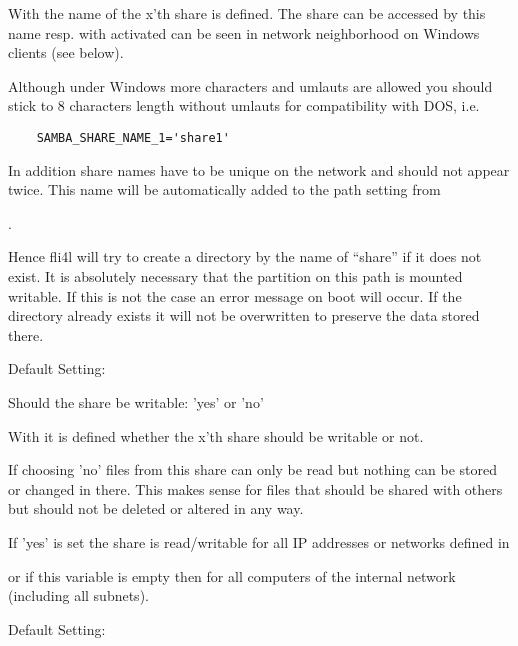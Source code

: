 \begin{description}

        With  the name of the x'th share is defined.
        The share can be accessed by this name resp. with 
        activated can be seen in network neighborhood on Windows clients
        (see  below).

        Although under Windows more characters and umlauts are allowed
        you should stick to 8 characters length without umlauts for
        compatibility with DOS,
        i.e.

\begin{example}
\begin{verbatim}
    SAMBA_SHARE_NAME_1='share1'
\end{verbatim}
\end{example}

  In addition share names have to be unique on the network and should not
  appear twice.
  This name will be automatically added to the path setting from

  .

  Hence fli4l will try to create a directory by the name of ``share'' if it does
  not exist.
  It is absolutely necessary that the partition on this path is mounted
  writable. If this is not the case an error message on boot will occur.
  If the directory already exists it will not be overwritten to preserve
  the data stored there.

  Default Setting: 

\end{description}

\begin{description}

  Should the share be writable: 'yes' or 'no'

  With  it is defined whether the x'th share
  should be writable or not.

  If choosing 'no' files from this share can only be read but nothing can
  be stored or changed in there. This makes sense for files that should
  be shared with others but should not be deleted or altered in any way.

  If 'yes' is set the share is read/writable for all IP addresses or
  networks defined in

  \var{SAMBA\_SHARE\_NET\_x]}

  or if this variable is empty then for all computers of the internal network
  (including all subnets).

  Default Setting: 

\end{description}

